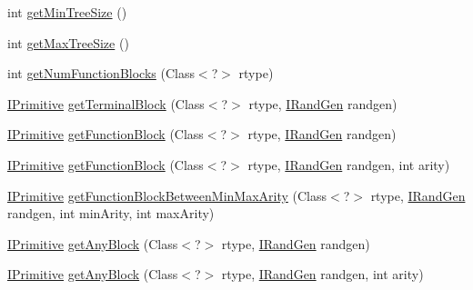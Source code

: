 \begin{DoxyCompactItemize}
\item 
int \hyperlink{classnet_1_1sf_1_1jclec_1_1exprtree_1_1_expr_tree_schema_ad49e4ffeebe1eb3c422f34b1ca538832}{get\-Min\-Tree\-Size} ()
\item 
int \hyperlink{classnet_1_1sf_1_1jclec_1_1exprtree_1_1_expr_tree_schema_a430bca305225d072c19d8d5e91e57df6}{get\-Max\-Tree\-Size} ()
\item 
int \hyperlink{classnet_1_1sf_1_1jclec_1_1exprtree_1_1_expr_tree_schema_af11961a8c6617b0f9586395214e3b598}{get\-Num\-Function\-Blocks} (Class$<$?$>$ rtype)
\item 
\hyperlink{interfacenet_1_1sf_1_1jclec_1_1exprtree_1_1_i_primitive}{I\-Primitive} \hyperlink{classnet_1_1sf_1_1jclec_1_1exprtree_1_1_expr_tree_schema_a759d602a5fdaacdf143fb1032f025f3c}{get\-Terminal\-Block} (Class$<$?$>$ rtype, \hyperlink{interfacenet_1_1sf_1_1jclec_1_1util_1_1random_1_1_i_rand_gen}{I\-Rand\-Gen} randgen)
\item 
\hyperlink{interfacenet_1_1sf_1_1jclec_1_1exprtree_1_1_i_primitive}{I\-Primitive} \hyperlink{classnet_1_1sf_1_1jclec_1_1exprtree_1_1_expr_tree_schema_a01f03482fb411f631134059614046a72}{get\-Function\-Block} (Class$<$?$>$ rtype, \hyperlink{interfacenet_1_1sf_1_1jclec_1_1util_1_1random_1_1_i_rand_gen}{I\-Rand\-Gen} randgen)
\item 
\hyperlink{interfacenet_1_1sf_1_1jclec_1_1exprtree_1_1_i_primitive}{I\-Primitive} \hyperlink{classnet_1_1sf_1_1jclec_1_1exprtree_1_1_expr_tree_schema_a4388f39f3a8afe57d292990eff11ccbf}{get\-Function\-Block} (Class$<$?$>$ rtype, \hyperlink{interfacenet_1_1sf_1_1jclec_1_1util_1_1random_1_1_i_rand_gen}{I\-Rand\-Gen} randgen, int arity)
\item 
\hyperlink{interfacenet_1_1sf_1_1jclec_1_1exprtree_1_1_i_primitive}{I\-Primitive} \hyperlink{classnet_1_1sf_1_1jclec_1_1exprtree_1_1_expr_tree_schema_a83ca8d577369144608f7c63b7ab7e00f}{get\-Function\-Block\-Between\-Min\-Max\-Arity} (Class$<$?$>$ rtype, \hyperlink{interfacenet_1_1sf_1_1jclec_1_1util_1_1random_1_1_i_rand_gen}{I\-Rand\-Gen} randgen, int min\-Arity, int max\-Arity)
\item 
\hyperlink{interfacenet_1_1sf_1_1jclec_1_1exprtree_1_1_i_primitive}{I\-Primitive} \hyperlink{classnet_1_1sf_1_1jclec_1_1exprtree_1_1_expr_tree_schema_aa1dd1be15d247f1433d9ee9efa69ec5e}{get\-Any\-Block} (Class$<$?$>$ rtype, \hyperlink{interfacenet_1_1sf_1_1jclec_1_1util_1_1random_1_1_i_rand_gen}{I\-Rand\-Gen} randgen)
\item 
\hyperlink{interfacenet_1_1sf_1_1jclec_1_1exprtree_1_1_i_primitive}{I\-Primitive} \hyperlink{classnet_1_1sf_1_1jclec_1_1exprtree_1_1_expr_tree_schema_acd7543c47aa831b8c5ef788fa986966c}{get\-Any\-Block} (Class$<$?$>$ rtype, \hyperlink{interfacenet_1_1sf_1_1jclec_1_1util_1_1random_1_1_i_rand_gen}{I\-Rand\-Gen} randgen, int arity)

\end{DoxyCompactItemize}
